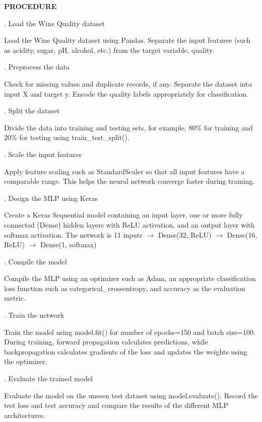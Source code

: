 \documentclass[11pt,twoside]{article}
\newcommand{\expheading}[1]{{\fontsize{14}{17}\selectfont\textbf{#1}\par}}
\begin{document}
{\expheading{PROCEDURE}
\vspace{4pt}
. Load the Wine Quality dataset\par
\noindent\hspace*{0.55cm}Load the Wine Quality dataset using Pandas. Separate the input features (such as acidity, sugar, pH, alcohol, etc.) from the target variable, quality.\par
{}. Preprocess the data\par
\noindent\hspace*{0.55cm}Check for missing values and duplicate records, if any. Separate the dataset into input X and target y. Encode the quality labels appropriately for classification.\par
{}. Split the dataset\par
\noindent\hspace*{0.55cm}Divide the data into training and testing sets, for example, 80\% for training and 20\% for testing using train\_test\_split().\par
{}. Scale the input features\par
\noindent\hspace*{0.55cm}Apply feature scaling such as StandardScaler so that all input features have a comparable range. This helps the neural network converge faster during training.\par
{}. Design the MLP using Keras\par
\noindent\hspace*{0.55cm}Create a Keras Sequential model containing an input layer, one or more fully connected (Dense) hidden layers with ReLU activation, and an output layer with softmax activation. The network is 11 inputs $\rightarrow$ Dense(32, ReLU) $\rightarrow$ Dense(16, ReLU) $\rightarrow$ Dense(1, softmax)\par
{}. Compile the model\par
\noindent\hspace*{0.55cm}Compile the MLP using an optimizer such as Adam, an appropriate classification loss function such as categorical\_crossentropy, and accuracy as the evaluation metric.\par
{}. Train the network\par
\noindent\hspace*{0.55cm}Train the model using model.fit() for number of epochs=150 and batch size=100. During training, forward propagation calculates predictions, while backpropagation calculates gradients of the loss and updates the weights using the optimizer.\par
{}. Evaluate the trained model\par
\noindent\hspace*{0.55cm}Evaluate the model on the unseen test dataset using model.evaluate(). Record the test loss and test accuracy and compare the results of the different MLP architectures. \par
\vspace{4pt}

}
\end{document}
